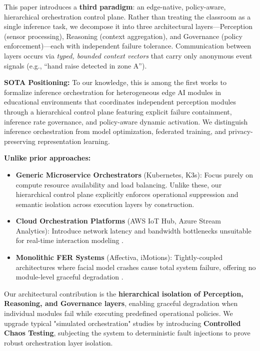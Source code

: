 \documentclass[conference]{IEEEtran}
\begin{document}
This paper introduces a \textbf{third paradigm}: an edge-native, policy-aware, hierarchical orchestration control plane. Rather than treating the classroom as a single inference task, we decompose it into three architectural layers---Perception (sensor processing), Reasoning (context aggregation), and Governance (policy enforcement)---each with independent failure tolerance. Communication between layers occurs via \textit{typed, bounded context vectors} that carry only anonymous event signals (e.g., ``hand raise detected in zone A'').

\textbf{SOTA Positioning:} To our knowledge, this is among the first works to formalize inference orchestration for heterogeneous edge AI modules in educational environments that coordinates independent perception modules through a hierarchical control plane featuring explicit failure containment, inference rate governance, and policy-aware dynamic activation. We distinguish inference orchestration from model optimization, federated training, and privacy-preserving representation learning.

\textbf{Unlike prior approaches:}
\begin{itemize}
\item \textbf{Generic Microservice Orchestrators} (Kubernetes, K3s): Focus purely on compute resource availability and load balancing. Unlike these, our hierarchical control plane explicitly enforces operational suppression and semantic isolation across execution layers by construction.
\item \textbf{Cloud Orchestration Platforms} (AWS IoT Hub, Azure Stream Analytics): Introduce network latency and bandwidth bottlenecks unsuitable for real-time interaction modeling \cite{b6}.
\item \textbf{Monolithic FER Systems} (Affectiva, iMotions): Tightly-coupled architectures where facial model crashes cause total system failure, offering no module-level graceful degradation \cite{b7}.
\end{itemize}

Our architectural contribution is the \textbf{hierarchical isolation of Perception, Reasoning, and Governance layers}, enabling graceful degradation when individual modules fail while executing predefined operational policies. We upgrade typical "simulated orchestration" studies by introducing \textbf{Controlled Chaos Testing}, subjecting the system to deterministic fault injections to prove robust orchestration layer isolation.
\end{document}
